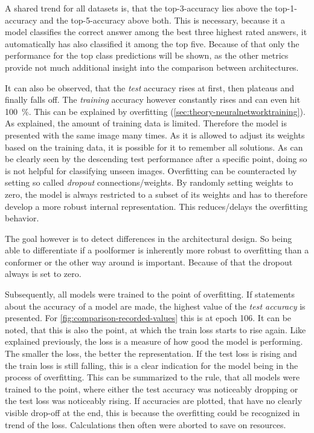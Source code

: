 A shared trend for all datasets is, that the top-3-accuracy lies above the top-1-accuracy and the top-5-accuracy above both. 
This is necessary, because it a model classifies the correct answer among the best three highest rated answers, it automatically has also classified it among the top five. 
Because of that only the performance for the top class predictions will be shown, as the other metrics provide not much  additional insight into the comparison between architectures.

It can also be observed, that the \emph{test} accuracy rises at first, then plateaus and finally falls off.
The \emph{training} accuracy however constantly rises and can even hit \SI[]{100}[]{\percent}.
This can be explained by overfitting (\autoref{sec:theory-neuralnetworktraining}).
As explained, the amount of training data is limited. 
Therefore the model is presented with the same image many times. 
As it is allowed to adjust its weights based on the training data, it is possible for it to \glqq remember\grqq{} all solutions.
As can be clearly seen by the descending test performance after a specific point, doing so is not helpful for classifying unseen images.
Overfitting can be counteracted by setting so called \emph{dropout} connections/weights.
By randomly setting weights to zero, the model is always restricted to a subset of its weights and has to therefore develop a more robust internal representation. This reduces/delays the overfitting behavior.

The goal however is to detect differences in the architectural design. 
So being able to differentiate if a poolformer is inherently more robust to overfitting than a conformer or the other way around is important. Because of that the dropout always is set to zero.

Subsequently, all models were trained to the point of overfitting. 
If statements about the accuracy of a model are made, the highest value of the \emph{test accuracy} is presented.
For \autoref{fig:comparison-recorded-values} this is at epoch 106.
It can be noted, that this is also the point, at which the train loss starts to rise again.
Like explained previously, the loss is a measure of how good the model is performing. 
The smaller the loss, the better the representation. 
If the test loss is rising and the train loss is still falling, this is a clear indication for the model being in the process of overfitting. 
This can be summarized to the rule, that all models were trained to the point, where either the test accuracy was noticeably dropping or the test loss was noticeably rising.
If accuracies are plotted, that have no clearly visible drop-off at the end, this is because the overfitting could be recognized in trend of the loss. 
Calculations then often were aborted to save on resources.

